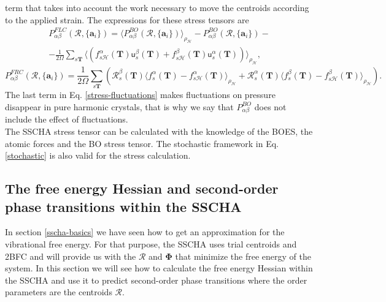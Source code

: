 term that takes into account the work necessary to move the centroids according to the applied strain. The expressions for these stress tensors are
\begin{multline}
 \label{stress-fluctuations}
 P_{\alpha\beta}^{FLC}(\boldsymbol{\mathcal{R}},\{\mathbf{a}_{i}\})=\langle P_{\alpha\beta}^{BO}(\boldsymbol{\mathcal{R}},\{\mathbf{a}_{i}\})\rangle_{\rho_{\mathcal{H}}}-
 P_{\alpha\beta}^{BO}(\boldsymbol{\mathcal{R}},\{\mathbf{a}_{i}\})- \\ -\frac{1}{2\Omega}\sum_{s\mathbf{T}}\langle(f_{s\mathcal{H}}^{\alpha}(\mathbf{T})\mathsf{u}_{s}^{\beta}(\mathbf{T})+
 f_{s\mathcal{H}}^{\beta}(\mathbf{T})\mathsf{u}_{s}^{\alpha}(\mathbf{T}))\rangle_{\rho_{\mathcal{H}}},
\end{multline}
\begin{equation}
 P_{\alpha\beta}^{FRC}(\boldsymbol{\mathcal{R}},\{\mathbf{a}_{i}\})=\frac{1}{2\Omega}\sum_{s\mathbf{T}}(\mathcal{R}_{s}^{\beta}(\mathbf{T})\langle f_{s}^{\alpha}(\mathbf{T})-f_{s\mathcal{H}}^{\alpha}(\mathbf{
 T})\rangle_{\rho_{\mathcal{H}}}+\mathcal{R}_{s}^{\alpha}(\mathbf{T})\langle f_{s}^{\beta}(\mathbf{T})-f_{s\mathcal{H}}^{\beta}(\mathbf{T})\rangle_{\rho_{\mathcal{H}}}).
\end{equation}
The last term in Eq. \ref{stress-fluctuations} makes fluctuations on pressure disappear in pure harmonic crystals\cite{monacelli2018pressure}, that is why we say that $P_{\alpha\beta}^{BO}$ does not include the effect
of fluctuations. \\

The SSCHA stress tensor can be calculated with the knowledge of the BOES, the atomic forces and the BO stress tensor. 
The stochastic framework in Eq. \ref{stochastic} is also valid for the stress calculation. 

\subsection{The free energy Hessian and second-order phase transitions within the SSCHA}
\label{free-energy-section}

In section \ref{sscha-basics} we have seen how to get an approximation for the vibrational free energy. For that purpose, the SSCHA uses trial centroids and 2BFC and will provide us with the $\boldsymbol{\mathcal{R}}$ 
and $\boldsymbol{\Phi}$ that minimize the free energy of the system. In this section we will see 
how to calculate the free energy Hessian within the SSCHA and use it to predict second-order phase transitions where the order parameters are the centroids $\boldsymbol{\mathcal{R}}$. \\

